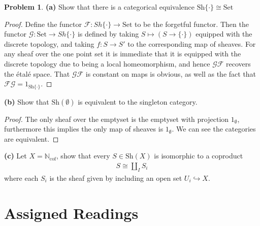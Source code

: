 \documentclass[10.5pt]{article}
\theoremstyle{definition}
\newtheorem{pb}{Problem}
\newcommand{\set}[1]{\{#1\}}
\begin{document}
    \begin{pb}
        \textbf{(a)} Show that there is a categorical equivalence \(\text{Sh}\set{\cdot} \cong \text{Set}\)
        \begin{proof}
            Define the functor \(\mathcal{F}: {Sh}\set{\cdot} \to \text{Set}\) to be the forgetful functor. Then the functor \(\mathcal{G}: \text{Set} \to {Sh}\set{\cdot}\) is defined by taking \(S \mapsto (S \to \set{\cdot})\) equipped with the discrete topology, and taking \(f: S \to S'\) to the corresponding map of sheaves. For any sheaf over the one point set it is immediate that it is equipped with the discrete topology due to being a local homeomorphism, and hence \(\mathcal{G} \mathcal{F}\) recovers the \'etal\'e space. That \(\mathcal{G} \mathcal{F}\) is constant on maps is obvious, as well as the fact that \(\mathcal{F}\mathcal{G} = 1_{\text{Sh}\set{\cdot}}\).
        \end{proof}

        \textbf{(b)} Show that \(\text{Sh}(\emptyset)\) is equivalent to the singleton category.
        \begin{proof}
            The only sheaf over the emptyset is the emptyset with projection \(1_\emptyset\), furthermore this implies the only map of sheaves is \(1_\emptyset\). We can see the categories are equivalent.
        \end{proof}

        \textbf{(c)} Let \(X = \mathbb{N}_{\text{cof}}\), show that every \(S \in \text{Sh}(X)\) is isomorphic to a coproduct
        \begin{align*}
            S \cong \coprod_I S_i
        \end{align*}
        where each \(S_i\) is the sheaf given by including an open set \(U_i \hookrightarrow X\).
    \end{pb}
    
    \section{Assigned Readings}
\end{document}
